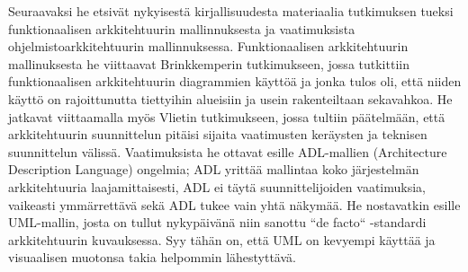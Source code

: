\documentclass[finnish]{tktltiki2}
\theoremstyle{definition}
\theoremstyle{remark}
\begin{document}
Seuraavaksi he etsivät nykyisestä kirjallisuudesta materiaalia tutkimuksen tueksi  funktionaalisen arkkitehtuurin mallinnuksesta ja vaatimuksista ohjelmistoarkkitehtuurin mallinnuksessa. Funktionaalisen arkkitehtuurin mallinuksesta he viittaavat Brinkkemperin tutkimukseen, jossa tutkittiin funktionaalisen arkkitehtuurin diagrammien käyttöä ja jonka tulos oli, että niiden käyttö on rajoittunutta tiettyihin alueisiin ja usein rakenteiltaan sekavahkoa. He jatkavat viittaamalla myös Vlietin tutkimukseen, jossa tultiin päätelmään, että arkkitehtuurin suunnittelun pitäisi sijaita vaatimusten keräysten ja teknisen suunnittelun välissä. Vaatimuksista he ottavat esille ADL-mallien (Architecture Description Language) ongelmia; ADL yrittää mallintaa koko järjestelmän arkkitehtuuria laajamittaisesti, ADL ei täytä suunnittelijoiden vaatimuksia, vaikeasti ymmärrettävä sekä ADL tukee vain yhtä näkymää. He nostavatkin esille UML-mallin, josta on tullut nykypäivänä niin sanottu ``de facto`` -standardi arkkitehtuurin kuvauksessa. Syy tähän on, että UML on kevyempi käyttää ja visuaalisen muotonsa takia helpommin lähestyttävä.       
 







%
%
% 
%

%
%




% 
\end{document}

